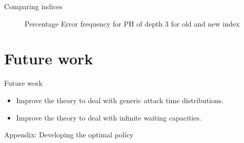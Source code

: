 \documentclass[10pt]{beamer}
\begin{document}
\begin{frame}{Comparing indices}

\begin{figure}[H]
\begin{center}
\resizebox{\linewidth}{!}{

}
\end{center}
\caption{Percentage Error frequency for PH of depth $3$ for old and new index}
\end{figure}

\end{frame}

\section{Future work}
\begin{frame}{Future work}
\begin{itemize}
\item Improve the theory to deal with generic attack time distributions.
\item Improve the theory to deal with infinite waiting capacities.
\end{itemize}
\end{frame}

\begin{frame}

\begin{center}
\Huge Appendix: Developing the optimal policy
\end{center}

\end{frame}
\end{document}
